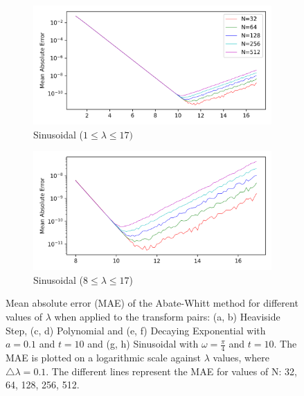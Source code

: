 \documentclass[a4paper]{report}
\begin{document}
\begin{figure}[H]
    \begin{subfigure}{.5\linewidth}
      \includegraphics[width=\linewidth]{images/abate_whitt/sinusoidal.png}
      \caption{Sinusoidal ($1 \leq \lambda \leq 17)$}
    \end{subfigure}\hfill
    \begin{subfigure}{.5\linewidth}
      \includegraphics[width=\linewidth]{images/abate_whitt/sinusoidal_zoomed.png}
      \caption{Sinusoidal ($8 \leq \lambda \leq 17$)}
    \end{subfigure}
    
    \caption{Mean absolute error (MAE) of the Abate-Whitt method for different values of $\lambda$ when applied to the transform pairs: (a, b) Heaviside Step, (c, d) Polynomial and (e, f) Decaying Exponential with $a = 0.1$ and $t = 10$ and (g, h) Sinusoidal with $\omega = \frac{\pi}{4}$ and $t = 10$. The MAE is plotted on a logarithmic scale against $\lambda$ values, where $\triangle \lambda = 0.1$. The different lines represent the MAE for values of N: 32, 64, 128, 256, 512.}
    \label{fig:MAE_Abate_Whitt}
\end{figure}
\end{document}

